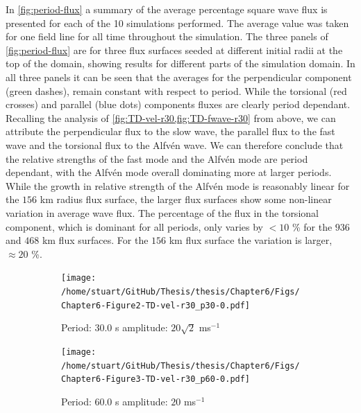 \documentclass[a4paper,12pt,fourier,authoryear,custommargin]{Classes/PhDThesisPSnPDF}
\begin{document}
In \cref{fig:period-flux} a summary of the average percentage square wave flux is presented for each of the 10
simulations performed.
The average value was taken for one field line for all time throughout the simulation.
The three panels of \cref{fig:period-flux} are for three flux surfaces seeded at different initial radii at the top of the domain, showing results for different parts of the simulation domain.
In all three panels it can be seen that the averages for the perpendicular component (green dashes), remain constant with respect to period.
While the torsional (red crosses) and parallel (blue dots) components fluxes are clearly period dependant.
Recalling the analysis of \cref{fig:TD-vel-r30,fig:TD-fwave-r30} from above, we can attribute the perpendicular flux to the slow wave, the parallel flux to the fast wave and the torsional flux to the Alfv\'en wave.
We can therefore conclude that the relative strengths of the fast mode and the Alfv\'en mode are period dependant, with the Alfv\'en mode overall dominating more at larger periods.
While the growth in relative strength of the Alfv\'en mode is reasonably linear for the $156$ km radius flux surface, the larger flux surfaces show some non-linear variation in average wave flux. 
The percentage of the flux in the torsional component, which is dominant for all periods, only varies by $<10$ \% for the $936$ and $468$ km flux surfaces.
For the $156$ km flux surface the variation is larger, $\approx 20$ \%.



\begin{figure}
    \centering


    \begin{subfigure}[b]{0.79\columnwidth}
        \texttt{[image: /home/stuart/GitHub/Thesis/thesis/Chapter6/Figs/Chapter6-Figure2-TD-vel-r30\_p30-0.pdf]}
        \caption{Period: $30.0$ s amplitude: $20\sqrt{2}$ ms$^{{-1}}$}
        \label{fig:TD-vel-r30-p30-0}
    \end{subfigure}

    \begin{subfigure}[b]{0.79\columnwidth}
        \texttt{[image: /home/stuart/GitHub/Thesis/thesis/Chapter6/Figs/Chapter6-Figure3-TD-vel-r30\_p60-0.pdf]}
        \caption{Period: $60.0$ s amplitude: $20$ ms$^{{-1}}$}
        \label{fig:TD-vel-r30-p60-0}
    \end{subfigure}
    \caption{}
    \label{fig:TD-vel-r30}
\end{figure}
\end{document}
